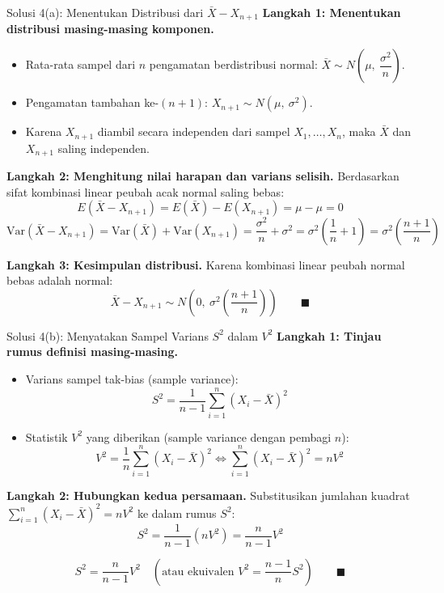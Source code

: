 \documentclass[10pt,twoside]{article}
\begin{document}
\begin{solbox}{Solusi 4(a): Menentukan Distribusi dari $\bar{X} - X_{n+1}$}
\textbf{Langkah 1: Menentukan distribusi masing-masing komponen.}
\begin{itemize}
  \item Rata-rata sampel dari $n$ pengamatan berdistribusi normal: $\bar{X} \sim N\left(\mu, \ \dfrac{\sigma^2}{n}\right)$.
  \item Pengamatan tambahan ke-$(n+1)$: $X_{n+1} \sim N(\mu, \ \sigma^2)$.
  \item Karena $X_{n+1}$ diambil secara independen dari sampel $X_1, \dots, X_n$, maka $\bar{X}$ dan $X_{n+1}$ saling independen.
\end{itemize}

\textbf{Langkah 2: Menghitung nilai harapan dan varians selisih.}
Berdasarkan sifat kombinasi linear peubah acak normal saling bebas:
\[
E(\bar{X} - X_{n+1}) = E(\bar{X}) - E(X_{n+1}) = \mu - \mu = 0
\]
\[
\mathrm{Var}(\bar{X} - X_{n+1}) = \mathrm{Var}(\bar{X}) + \mathrm{Var}(X_{n+1}) = \frac{\sigma^2}{n} + \sigma^2 = \sigma^2 \left(\frac{1}{n} + 1\right) = \sigma^2 \left(\frac{n+1}{n}\right)
\]

\textbf{Langkah 3: Kesimpulan distribusi.}
Karena kombinasi linear peubah normal bebas adalah normal:
\[
\boxed{\bar{X} - X_{n+1} \sim N\left(0, \ \sigma^2 \left(\frac{n+1}{n}\right)\right)} \qquad \blacksquare
\]
\end{solbox}

\begin{solbox}{Solusi 4(b): Menyatakan Sampel Varians $S^2$ dalam $V^2$}
\textbf{Langkah 1: Tinjau rumus definisi masing-masing.}
\begin{itemize}
  \item Varians sampel tak-bias (sample variance):
  \[
  S^2 = \frac{1}{n-1} \sum_{i=1}^n (X_i - \bar{X})^2
  \]
  \item Statistik $V^2$ yang diberikan (sample variance dengan pembagi $n$):
  \[
  V^2 = \frac{1}{n} \sum_{i=1}^n (X_i - \bar{X})^2 \iff \sum_{i=1}^n (X_i - \bar{X})^2 = n V^2
  \]
\end{itemize}

\textbf{Langkah 2: Hubungkan kedua persamaan.}
Substitusikan jumlahan kuadrat $\sum_{i=1}^n (X_i - \bar{X})^2 = n V^2$ ke dalam rumus $S^2$:
\[
S^2 = \frac{1}{n-1} \left(n V^2\right) = \frac{n}{n-1} V^2
\]

\[
\boxed{S^2 = \frac{n}{n-1} V^2 \quad \left(\text{atau ekuivalen } V^2 = \frac{n-1}{n} S^2\right)} \qquad \blacksquare
\]
\end{solbox}
\end{document}
